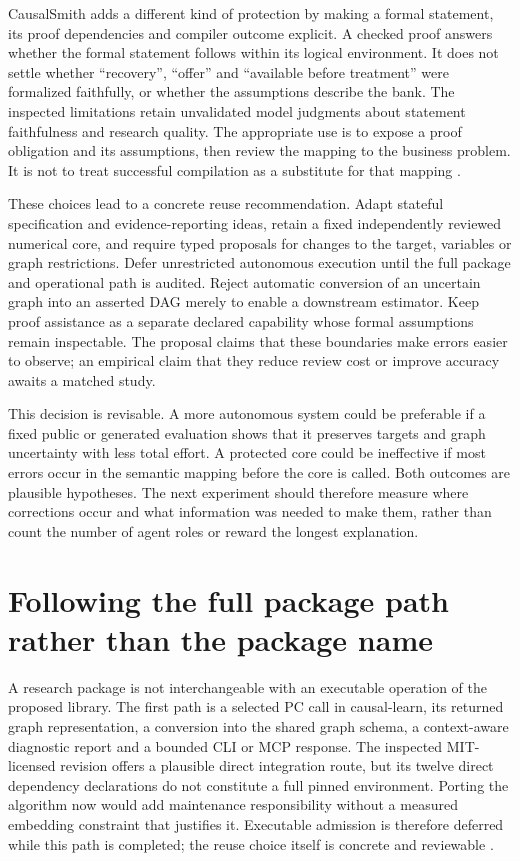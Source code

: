 CausalSmith adds a different kind of protection by making a formal statement,
its proof dependencies and compiler outcome explicit. A checked proof answers
whether the formal statement follows within its logical environment. It does
not settle whether ``recovery'', ``offer'' and ``available before treatment''
were formalized faithfully, or whether the assumptions describe the bank.
The inspected limitations retain unvalidated model judgments about statement
faithfulness and research quality. The appropriate use is to expose a proof
obligation and its assumptions, then review the mapping to the business problem.
It is not to treat successful compilation as a substitute for that mapping
\citep{exec13_census_causalsmith}.

These choices lead to a concrete reuse recommendation. Adapt stateful
specification and evidence-reporting ideas, retain a fixed independently
reviewed numerical core, and require typed proposals for changes to the target,
variables or graph restrictions. Defer unrestricted autonomous execution until
the full package and operational path is audited. Reject automatic conversion
of an uncertain graph into an asserted DAG merely to enable a downstream
estimator. Keep proof assistance as a separate declared capability whose
formal assumptions remain inspectable. The proposal claims that these boundaries
make errors easier to observe; an empirical claim that they reduce review cost
or improve accuracy awaits a matched study.

This decision is revisable. A more autonomous system could be preferable if a
fixed public or generated evaluation shows that it preserves targets and graph
uncertainty with less total effort. A protected core could be ineffective if
most errors occur in the semantic mapping before the core is called. Both
outcomes are plausible hypotheses. The next experiment should therefore measure
where corrections occur and what information was needed to make them, rather
than count the number of agent roles or reward the longest explanation.

\section{Following the full package path rather than the package name}

A research package is not interchangeable with an executable operation of the
proposed library. The first path is a selected PC call in causal-learn, its
returned graph representation, a conversion into the shared graph schema,
a context-aware diagnostic report and a bounded CLI or MCP response. The
inspected MIT-licensed revision offers a plausible direct integration route,
but its twelve direct dependency declarations do not constitute a full pinned
environment. Porting the algorithm now would add maintenance responsibility
without a measured embedding constraint that justifies it. Executable admission
is therefore deferred while this path is completed; the reuse choice itself is
concrete and reviewable \citep{exec14_causallearn_reuse}.

